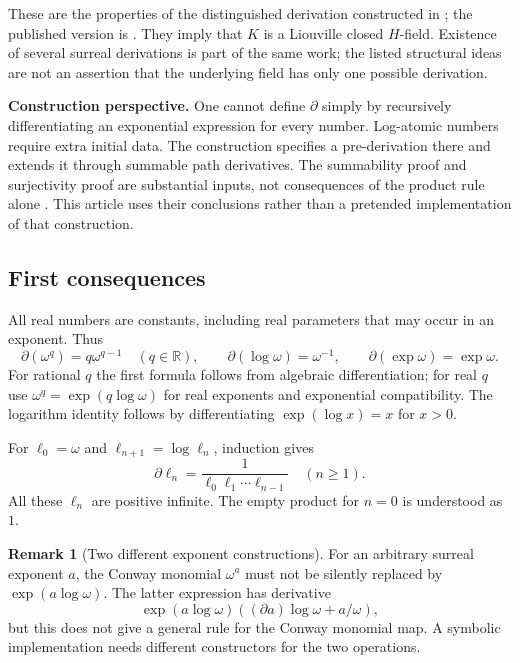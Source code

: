 \documentclass[11pt]{article}
\numberwithin{equation}{section}
\theoremstyle{definition}
\newtheorem{remark}[theorem]{Remark}
\newcommand{\R}{\mathbb R}
\newcommand{\DD}{\partial}
\newcommand{\assertion}[1]{\par\smallskip\noindent\textbf{#1}\quad}
\begin{document}
These are the properties of the distinguished derivation constructed in
\cite[Theorems A and B]{BM}; the published version is
\cite{BMpub}. They imply that $K$ is a Liouville closed $H$-field.
Existence of several surreal derivations is part of the same work; the
listed structural ideas are not an assertion that the underlying field has
only one possible derivation.

\assertion{Construction perspective.}
One cannot define $\DD$ simply by recursively differentiating an exponential
expression for every number. Log-atomic numbers require extra initial data.
The construction specifies a pre-derivation there and extends it through
summable path derivatives. The summability proof and surjectivity proof are
substantial inputs, not consequences of the product rule alone
\cite[\S\S6--7]{BM}. This article uses their conclusions rather than a
pretended implementation of that construction.

\subsection{First consequences}
All real numbers are constants, including real parameters that may occur in
an exponent. Thus
\begin{equation}\label{eq:basicderivatives}
 \DD(\omega^q)=q\omega^{q-1}\quad(q\in\R),\qquad
 \DD(\log\omega)=\omega^{-1},\qquad
 \DD(\exp\omega)=\exp\omega.
\end{equation}
For rational $q$ the first formula follows from algebraic differentiation;
for real $q$ use $\omega^q=\exp(q\log\omega)$ for real exponents and
exponential compatibility. The logarithm identity follows by
differentiating $\exp(\log x)=x$ for $x>0$.

For $\ell_0=\omega$ and $\ell_{n+1}=\log\ell_n$, induction gives
\begin{equation}\label{eq:logtower}
 \DD\ell_n=\frac{1}{\ell_0\ell_1\cdots\ell_{n-1}}
 \quad(n\ge1).
\end{equation}
All these $\ell_n$ are positive infinite. The empty product for $n=0$ is
understood as $1$.

\begin{remark}[Two different exponent constructions]
For an arbitrary surreal exponent $a$, the Conway monomial $\omega^a$ must
not be silently replaced by $\exp(a\log\omega)$. The latter expression has
derivative
\[
 \exp(a\log\omega)\left((\DD a)\log\omega+a/\omega\right),
\]
but this does not give a general rule for the Conway monomial map. A
symbolic implementation needs different constructors for the two operations.
\end{remark}
\end{document}
